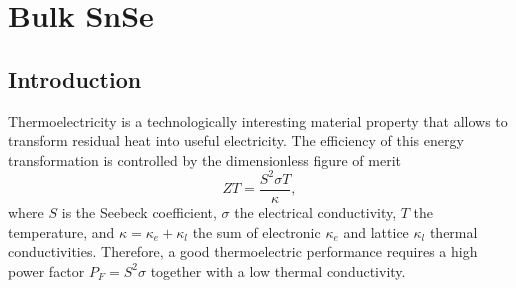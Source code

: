 
\chapter{Bulk SnSe} %

\label{Chapter5} %




\section{Introduction}

Thermoelectricity is a technologically interesting material property that allows to transform residual heat into useful electricity\cite{goldsmid2010introduction,behnia2015fundamentals}. The efficiency of this energy 
transformation is controlled by the dimensionless figure of merit
\begin{equation}
ZT=\frac{S^{2}\sigma T}{\kappa},
\end{equation}
where $S$ is the Seebeck coefficient, $\sigma$ the electrical conductivity, $T$ the temperature, and $\kappa=\kappa_{e}+\kappa_{l}$ the sum of electronic $\kappa_{e}$ and lattice $\kappa_{l}$ thermal conductivities. Therefore, a 
good thermoelectric performance requires a high power factor $P_{F}=S^{2}\sigma$ together with a low thermal conductivity. \\

